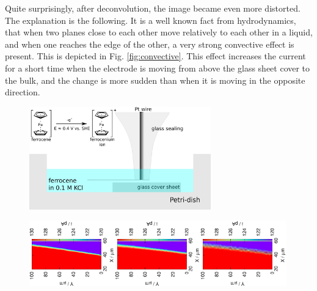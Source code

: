 \documentclass[a4paper, 11pt, oneside, bibliography=totoc]{article}
\begin{document}
Quite surprisingly, after deconvolution, the image became even more distorted. The explanation is the following. It is a well known fact from hydrodynamics, that when two planes close to each other move relatively to each other in a liquid, and when one reaches the edge of the other, a very strong convective effect is present. This is depicted in Fig. \ref{fig:convective}. This effect increases the current for a short time when the electrode is moving from above the glass sheet cover to the bulk, and the change is more sudden than when it is moving in the opposite direction.

\begin{figure}
\centering
\includegraphics[width=0.7\textwidth]{step.eps}

\includegraphics[trim = 10mm 60mm 0mm 60mm, clip, width=0.33\textwidth, angle=-90]{1.eps}\includegraphics[trim = 10mm 60mm 0mm 60mm, clip, width=0.33\textwidth, angle=-90]{2_meandered.eps}\includegraphics[trim = 10mm 60mm 0mm 60mm, clip, width=0.33\textwidth, angle=-90]{2_meandered_deconvoluted.eps}


\end{figure}
\end{document}
